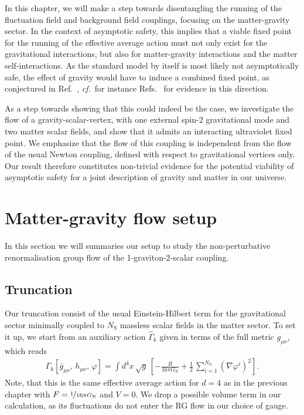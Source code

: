 \documentclass[11pt]{book}
\newcommand\gmunu{ g_{\mu\nu} }
\newcommand\bgmunu{ \bar g_{\mu\nu} }
\newcommand\hmunu{ h_{\mu\nu} }
\newcommand\NS{ N_{\scriptscriptstyle{\mathrm{S}}} }
\newcommand\GNewton{ G_{\scriptscriptstyle{\mathrm{N}}}{} }
\newcommand\cf{\textit{cf.}\ }
\numberwithin{equation}{chapter}
\begin{document}
In this chapter, we will make a step towards disentangling the running of the fluctuation field and
background field couplings, focusing on the matter-gravity sector.
In the context of asymptotic safety, this implies that a viable fixed point
for the running of the effective average action must not only exist
for the gravitational interactions, but also for matter-gravity interactions and the
matter self-interactions.
As the standard model by itself is most likely not asymptotically safe,
the effect of gravity would have to induce a combined fixed point,
as conjectured in Ref.~\cite{Shaposhnikov:2009pv},
\cf for instance Refs.~\cite{Zanusso:2009bs, Vacca:2010mj,
Harst:2011zx, Eichhorn:2011pc, Eichhorn:2012va,Oda:2015sma
} for evidence in this direction.

As a step towards showing that this could indeed be the case,
we investigate the flow of a gravity-scalar-vertex,
with one external spin-2 gravitational mode and two matter
scalar fields,
and show that it admits an interacting ultraviolet fixed point.
We emphasize that the flow of this coupling is independent from the flow of the usual Newton coupling,
defined with respect to gravitational vertices only.
Our result therefore constitutes non-trivial evidence for the potential viability of asymptotic safety
for a joint description of gravity and matter in our universe.


\section{Matter-gravity flow setup}

In this section we will summaries our setup to study the
non-perturbative renormalisation group flow of the
1-graviton-2-scalar coupling.

\subsection{Truncation}

Our truncation consist of the usual Einstein-Hilbert term for the gravitational sector minimally coupled
to $\NS$ massless scalar fields in the matter sector.
To set it up, we start from an auxiliary action $\hat{\Gamma}_k$ given in terms of the full
metric $\gmunu$, which reads
\begin{align}
  \hat \Gamma_k[\bgmunu, \, \hmunu, \, \varphi] = \int d^4x \, \sqrt{g} \,
  \left[
    - \frac{R}{16 \pi \GNewton} + \frac{1}{2} \, \sum_{i=1}^{\NS} \left( \nabla\varphi^i \right)^2
  \right] .
\end{align}
Note, that this is the same effective average action for $d=4$ as in the previous chapter with
$F=\nicefrac{1}{16\pi\GNewton}$ and $V=0$.
We drop a possible volume term in our calculation,
as its fluctuations do not enter the RG flow in our choice of gauge.
\end{document}
